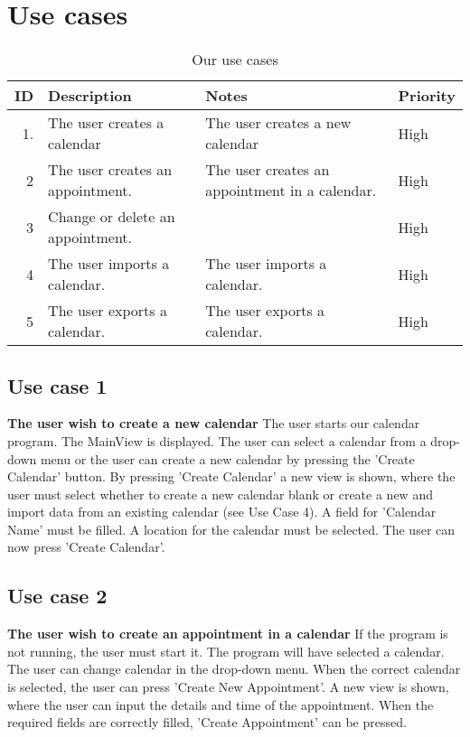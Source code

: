 \section{Use cases}
\begin{table*}[ht]\centering
  \begin{tabularx}{\textwidth}{@{}rXXl@{}}\toprule
    \textbf{ID} & \textbf{Description} & \textbf{Notes} & \textbf{Priority} \\\hline
    1.
    & The user creates a calendar
    & The user creates a new calendar
    & High \\\hline
    2 
    & The user creates an appointment.
    & The user creates an appointment in a calendar.
    & High \\\hline
    3 
    & Change or delete an appointment.
    & 
    & High \\\hline
    4 
    & The user imports a calendar.
    & The user imports a calendar.
    & High \\\hline
    5 
    & The user exports a calendar.
    & The user exports a calendar.
    & High \\
    \bottomrule
  \end{tabularx}
  \caption{Our use cases}
  \label{usecases}\centering%
\end{table*}

\subsection{Use case 1}
\textbf{The user wish to create a new calendar}
The user starts our calendar program. The MainView is displayed. The user can select a calendar from a drop-down menu or the user can create a new calendar by pressing the 'Create Calendar' button.
By pressing 'Create Calendar' a new view is shown, where the user must select whether to create a new calendar blank or create a new and import data from an existing calendar (see Use Case 4).
A field for 'Calendar Name' must be filled.
A location for the calendar must be selected.
The user can now press 'Create Calendar'.

\subsection{Use case 2}
\textbf{The user wish to create an appointment in a calendar}
If the program is not running, the user must start it.
The program will have selected a calendar. The user can change calendar in the drop-down menu.
When the correct calendar is selected, the user can press 'Create New Appointment'.
A new view is shown, where the user can input the details and time of the appointment.
When the required fields are correctly filled, 'Create Appointment' can be pressed.


